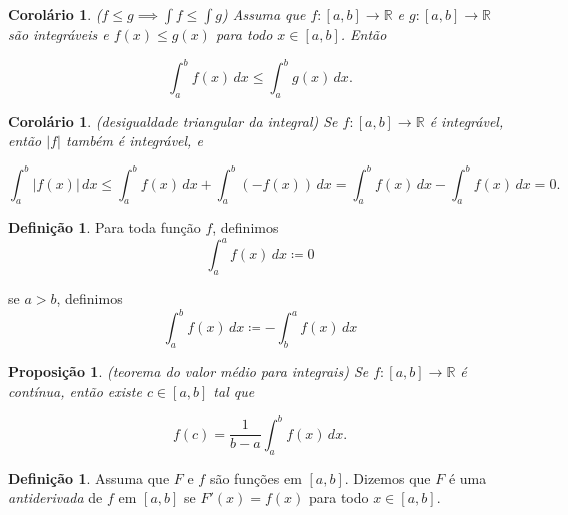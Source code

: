 \documentclass[12pt]{article}
\theoremstyle{plain}
\newtheorem{prop}[thm]{Proposição}
\newtheorem{cor}[thm]{Corolário}
\theoremstyle{definition}
\newtheorem{defn}[thm]{Definição}
\theoremstyle{remark}
\begin{document}
\begin{cor} (\(f\leq g \implies \int f \leq \int g\))
    Assuma que \(f: [a,b] \to \mathbb{R}\) e \(g: [a,b] \to \mathbb{R}\) são integráveis e \(f(x) \leq g(x)\) para todo \(x \in [a,b]\). Então

    \begin{equation}
        \int_a^b f(x) \, dx \leq \int_a^b g(x) \, dx.
    \end{equation}
\end{cor}

\begin{cor} (desigualdade triangular da integral)
    Se \(f: [a,b] \to \mathbb{R}\) é integrável, então \(\vert f \vert\) também é integrável, e

    \begin{equation}
        \int_a^b \vert f(x) \vert \, dx \leq \int_a^b f(x) \, dx + \int_a^b (-f(x)) \, dx = \int_a^b f(x) \, dx - \int_a^b f(x) \, dx = 0.
    \end{equation}
\end{cor}

\begin{defn}
    Para toda função \(f\), definimos \[\int_{a}^{a}f(x) \, dx \coloneq 0\]

    \noindent se \(a > b\), definimos \[\int_{a}^{b}f(x) \, dx \coloneq -\int_{b}^{a}f(x) \, dx\]
\end{defn}

\begin{prop} (teorema do valor médio para integrais)
    Se \(f : [a,b] \to \mathbb{R}\) é contínua, então existe \(c \in [a,b]\) tal que

    \begin{equation}
        f(c) = \frac{1}{b-a} \int_a^b f(x) \, dx.
    \end{equation}
\end{prop}

\begin{defn}
    Assuma que \(F\) e \(f\) são funções em \([a,b]\). Dizemos que \(F\) é uma \emph{antiderivada} de \(f\) em \([a,b]\) se \(F'(x) = f(x)\) para todo \(x \in [a,b]\).
\end{defn}
\end{document}
